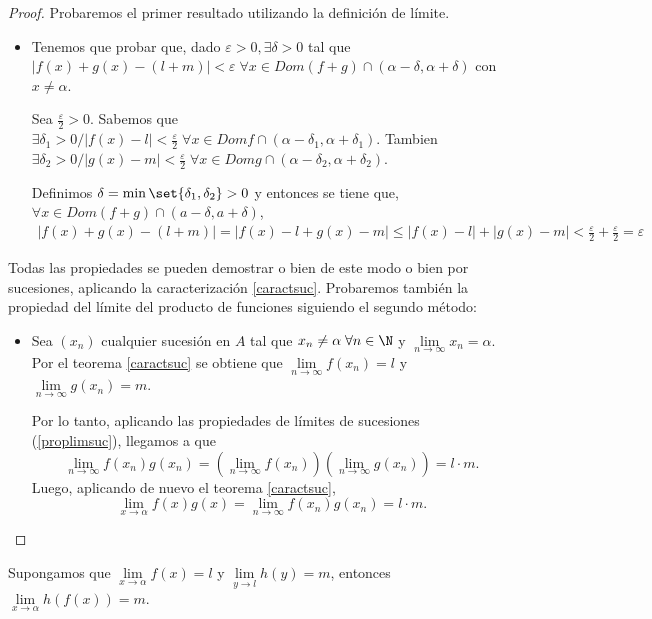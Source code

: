 \begin{proof}
	Probaremos el primer resultado utilizando la definición de límite.
	\begin{itemize}
		\item Tenemos que probar que, dado \(\varepsilon > 0, \exists \delta > 0 \) tal que \(\left\vert f(x) + g(x) - (l + m ) \right\vert < \varepsilon \; \forall x \in Dom(f + g) \cap (\alpha - \delta, \alpha + \delta)\) con \( x \neq \alpha \).
		      
		      Sea \(\frac{\varepsilon}{2} > 0 \). Sabemos que \(\exists \delta_1 > 0 / \left\vert f(x) - l  \right\vert < \frac{\varepsilon}{2} \; \forall x \in Domf \cap (\alpha - \delta_1, \alpha + \delta_1) \). Tambien \(\exists  \delta_2 > 0 / \left\vert g(x) - m  \right\vert < \frac{\varepsilon}{2} \; \forall x \in Domg \cap (\alpha - \delta_2, \alpha + \delta_2)\).
		      
		      Definimos \(\delta = \min \set{\delta_1,\delta_2} > 0 \) y entonces se tiene que, \(\forall x \in Dom(f + g) \cap (a - \delta, a + \delta)\),  
		      \begin{multline*}
			      \left\vert f(x) + g(x) - (l + m ) \right\vert = \left\vert f(x) - l + g(x) - m  \right\vert \leq \left\vert f(x) - l  \right\vert + \left\vert g(x )  - m \right\vert < \frac{\varepsilon}{2} + \frac{\varepsilon}{2} = \varepsilon
		      \end{multline*}
	\end{itemize}
	Todas las propiedades se pueden demostrar o bien de este modo o bien por sucesiones, aplicando la caracterización \ref{caractsuc}. Probaremos también la propiedad del límite del producto de funciones siguiendo el segundo método: 
	\begin{itemize}
		\item Sea \((x_n )\) cualquier sucesión en \(A \) tal que \(x_n \neq \alpha \; \forall n \in \N\) y \( \lim\limits_{n \to \infty} x_n = \alpha\). Por el teorema \ref{caractsuc} se obtiene que \(\lim\limits_{n \to \infty} f(x_n) = l \) y \(\lim\limits_{n \to \infty} g(x_n) = m\).
		      
		      Por lo tanto, aplicando las propiedades de límites de sucesiones (\ref{proplimsuc}), llegamos a que 
		      \[
			      \lim\limits_{n \to \infty} f(x_n) g(x_n) = (\lim\limits_{n \to \infty} f(x_n)) (\lim\limits_{n \to \infty} g(x_n)) = l \cdot m.
		      \]
		      Luego, aplicando de nuevo el teorema \ref{caractsuc}, 
		      \[
			      \lim\limits_{x  \to \alpha} f(x)g(x ) = \lim\limits_{n \to \infty} f(x_n) g(x_n) = l \cdot m. 
		      \]
	\end{itemize}
\end{proof}
\begin{proposition}
	Supongamos que \(\lim\limits_{x  \to \alpha} f(x) = l \) y \(\lim\limits_{y  \to l} h(y) =m  \), entonces \(\lim\limits_{x  \to \alpha} h(f(x)) = m \).
\end{proposition}

